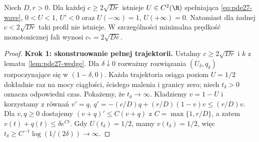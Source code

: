 \begin{twierdzenie}
\label{thm:pde27-wave}
Niech $D,r>0$. Dla każdej $c\ge2\sqrt{Dr}$
istnieje $U\in C^2(\R)$ spełniająca
\eqref{eq:pde27-wave}, $0<U<1$, $U'<0$ oraz
$U(-\infty)=1$, $U(+\infty)=0$.
Natomiast dla żadnej $c<2\sqrt{Dr}$
taki profil nie istnieje. W szczególności
minimalna prędkość monotonicznej fali wynosi
$c_*=2\sqrt{Dr}$.
\end{twierdzenie}
\begin{proof}
\textbf{Krok 1: skonstruowanie pełnej trajektorii.}
Ustalmy $c\ge2\sqrt{Dr}$ i $k$ z
lematu~\ref{lem:pde27-wedge}. Dla $\delta\downarrow0$
rozważmy rozwiązania $(U_\delta,q_\delta)$
rozpoczynające się w $(1-\delta,0)$.
Każda trajektoria osiąga poziom $U=1/2$ dokładnie raz
na mocy ciągłości, ścisłego malenia i granicy zero;
niech $t_\delta>0$ oznacza odpowiedni czas.
Pokażemy, że $t_\delta\to\infty$.
Kładziemy $v=1-U$ i korzystamy z równań
$v'=q$, $q'=-(c/D)q+(r/D)(1-v)v\le(r/D)v$.
Dla $v,q\ge0$ dostajemy
$(v+q)'\le C(v+q)$ z $C=\max\{1,r/D\}$,
a zatem $v(t)+q(t)\le\delta e^{Ct}$.
Gdy $U(t_\delta)=1/2$, mamy $v(t_\delta)=1/2$,
więc $t_\delta\ge C^{-1}\log(1/(2\delta))\to\infty$.


\end{proof}
